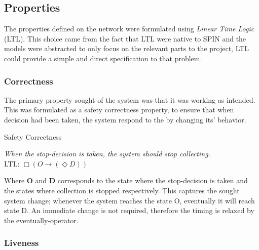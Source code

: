 \subsection{Properties}

The properties defined on the network were formulated using \textit{Linear Time Logic} (LTL). This choice came from the fact that LTL were native to SPIN and the models were abstracted to only focus on the relevant parts to the project, LTL could provide a simple and direct specification to that problem.

\subsubsection{Correctness}

The primary property sought of the system was that it was working as intended. This was formulated as a safety correctness property, to ensure that when decision had been taken, the system respond to the by changing its' behavior.


\begin{definition}{}{} 
Safety Correctness

\textit{When the stop-decision is taken, the system should stop collecting.} \\ 

LTL: $\Box (O \rightarrow (\Diamond D)) $ \\
\end{definition}

Where \textbf{O} and \textbf{D} corresponds to the state where the stop-decision is taken and the states where collection is stopped respectively. This captures the sought system change; whenever the system reaches the state O, eventually it will reach state D. An immediate change is not required, therefore the timing is relaxed by the eventually-operator.

\subsubsection{Liveness}


